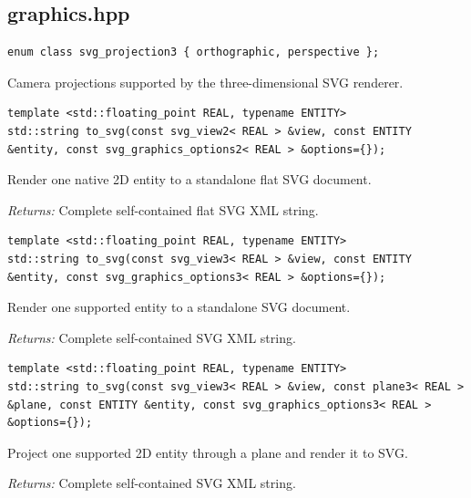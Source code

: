\subsection{graphics.hpp}
\par\noindent\begin{minipage}{\linewidth}
\begin{lstlisting}[style=apireference]
enum class svg_projection3 { orthographic, perspective };
\end{lstlisting}
{\footnotesize Camera projections supported by the three-dimensional SVG renderer.\par}
\end{minipage}\par\vspace{1pt}
\par\noindent\begin{minipage}{\linewidth}
\begin{lstlisting}[style=apireference]
template <std::floating_point REAL, typename ENTITY>
std::string to_svg(const svg_view2< REAL > &view, const ENTITY &entity, const svg_graphics_options2< REAL > &options={});
\end{lstlisting}
{\footnotesize Render one native 2D entity to a standalone flat SVG document.\par}
{\footnotesize\textit{Returns:} Complete self-contained flat SVG XML string.\par}
\end{minipage}\par\vspace{1pt}
\par\noindent\begin{minipage}{\linewidth}
\begin{lstlisting}[style=apireference]
template <std::floating_point REAL, typename ENTITY>
std::string to_svg(const svg_view3< REAL > &view, const ENTITY &entity, const svg_graphics_options3< REAL > &options={});
\end{lstlisting}
{\footnotesize Render one supported entity to a standalone SVG document.\par}
{\footnotesize\textit{Returns:} Complete self-contained SVG XML string.\par}
\end{minipage}\par\vspace{1pt}
\par\noindent\begin{minipage}{\linewidth}
\begin{lstlisting}[style=apireference]
template <std::floating_point REAL, typename ENTITY>
std::string to_svg(const svg_view3< REAL > &view, const plane3< REAL > &plane, const ENTITY &entity, const svg_graphics_options3< REAL > &options={});
\end{lstlisting}
{\footnotesize Project one supported 2D entity through a plane and render it to SVG.\par}
{\footnotesize\textit{Returns:} Complete self-contained SVG XML string.\par}
\end{minipage}\par\vspace{1pt}
